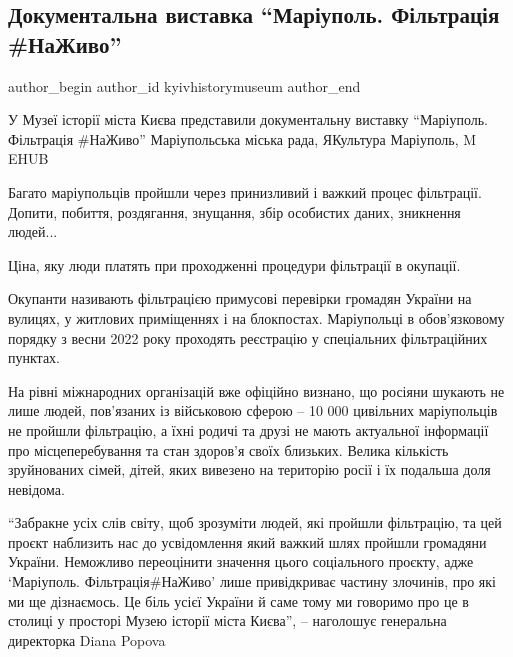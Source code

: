  
 
 
 
 

\subsection{Документальна виставка \enquote{Маріуполь. Фільтрація \#НаЖиво}}
\label{sec:20_07_2023.fb.kyivhistorymuseum.1.dokumentalna_vystavka_mariupol_filtracia_nazhyvo}

\ifcmt
 author_begin
   author_id kyivhistorymuseum
 author_end
\fi

У Музеї історії міста Києва представили документальну виставку \enquote{Маріуполь.
Фільтрація \#НаЖиво} Маріупольська міська рада, ЯКультура Маріуполь, M EHUB  

Багато маріупольців пройшли через принизливий і важкий процес фільтрації.
Допити, побиття, роздягання, знущання, збір особистих даних, зникнення людей...

Ціна, яку люди платять при проходженні  процедури фільтрації в окупації. 

Окупанти називають фільтрацією примусові перевірки громадян України на вулицях,
у житлових приміщеннях і на блокпостах. Маріупольці в обов'язковому порядку з
весни 2022 року проходять реєстрацію у спеціальних фільтраційних пунктах. 

На рівні міжнародних організацій вже офіційно визнано, що росіяни шукають не
лише людей, пов'язаних із військовою сферою – 10 000 цивільних маріупольців не
пройшли фільтрацію, а їхні родичі та друзі не мають актуальної інформації про
місцеперебування та стан здоров'я своїх близьких. Велика кількість зруйнованих
сімей,  дітей, яких вивезено на територію росії і їх подальша доля невідома.

\enquote{Забракне усіх слів світу, щоб зрозуміти людей, які пройшли фільтрацію,
та цей проєкт наблизить нас до усвідомлення який важкий шлях пройшли громадяни
України. Неможливо переоцінити значення цього соціального проєкту, адже
\enquote{Маріуполь. Фільтрація\#НаЖиво} лише привідкриває частину злочинів, про
які ми ще дізнаємось. Це біль усієї України й саме тому ми говоримо про це в
столиці у просторі Музею історії міста Києва}, – наголошує генеральна
директорка Diana Popova


